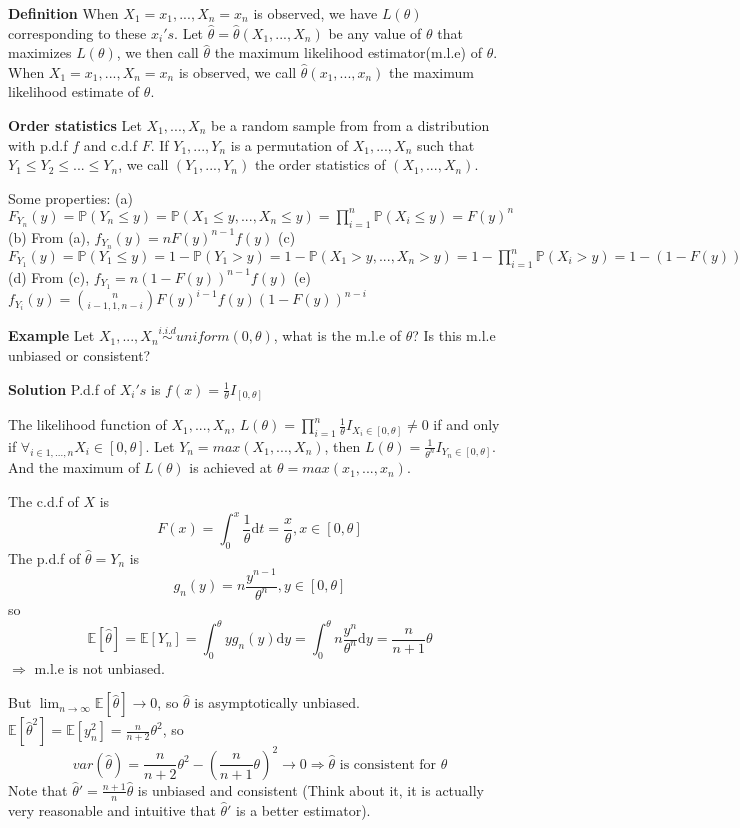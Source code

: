 \documentclass[a4paper,12pt]{article}
\begin{document}
\textbf{Definition} When $X_1 = x_1, ..., X_n = x_n$ is observed, we have $L(\theta)$ corresponding to these $x_i's$. Let $\hat{\theta} = \hat{\theta}(X_1, ..., X_n)$ be any value of $\theta$ that maximizes $L(\theta)$, we then call $\hat{\theta}$ the maximum likelihood estimator(m.l.e) of $\theta$. When $X_1 = x_1, ..., X_n = x_n$ is observed, we call $\hat{\theta}(x_1, ..., x_n)$ the maximum likelihood estimate of $\theta$.

\textbf{Order statistics}
Let $X_1, ..., X_n$ be a random sample from from a distribution with p.d.f $f$ and c.d.f $F$. If $Y_1, ..., Y_n$ is a permutation of $X_1, ..., X_n$ such that $Y_1 \leq Y_2 \leq ... \leq Y_n$, we call $(Y_1, ..., Y_n)$ the order statistics of $(X_1, ..., X_n)$. 

Some properties: 
(a) $F_{Y_n}(y) = \mathbb{P}( Y_n \leq y ) = \mathbb{P}(X_1 \leq y, ..., X_n \leq y) = \prod_{i=1}^n \mathbb{P}(X_i \leq y) = F(y)^n$ 
(b) From (a), $f_{Y_n} (y) = n F(y)^{n-1}f(y)$ 
(c) $F_{Y_1}(y) = \mathbb{P}( Y_1 \leq y ) = 1-\mathbb{P}( Y_1 > y ) = 1-\mathbb{P}(X_1 > y, ..., X_n > y) = 1-\prod_{i=1}^n \mathbb{P}(X_i > y) = 1-(1-F(y))^n$ 
(d) From (c), $f_{Y_1} = n(1-F(y))^{n-1}f(y)$ 
(e) $f_{Y_i}(y) = {n \choose i-1, 1, n-i} F(y)^{i-1}f(y)(1-F(y))^{n-i}$ 

\textbf{Example} Let $X_1, ..., X_n \overset{i.i.d}{\sim} uniform(0, \theta)$, what is the m.l.e of $\theta$? Is this m.l.e unbiased or consistent? 

\textbf{Solution} P.d.f of $X_i's$ is $f(x) = \frac{1}{\theta} I_{[0, \theta]}$

The likelihood function of $X_1, ..., X_n$, $L(\theta) = \prod_{i=1}^n \frac{1}{\theta} I_{X_i \in [0, \theta]} \neq 0$ if and only if $\forall_{i\in 1, ..., n} X_i \in [0, \theta]$. Let $Y_n = max(X_1, ..., X_n)$, then $L(\theta) = \frac{1}{\theta^n}I_{Y_n \in [0, \theta]}$. And the maximum of $L(\theta)$ is achieved at $\theta = max(x_1, ..., x_n)$.

The c.d.f of $X$ is
$$F(x) = \int_0^x \frac{1}{\theta}\mathrm{d}t = \frac{x}{\theta}, x\in [0, \theta]$$
The p.d.f of $\hat{\theta} = Y_n$ is
$$g_n(y) = n\frac{y^{n-1}}{\theta^n}, y \in [0, \theta]$$
so
$$\mathbb{E}[ \hat{\theta} ] = \mathbb{E}[Y_n] = \int_0^\theta y g_n(y) \mathrm{d}y = \int_0^\theta n\frac{y^n}{\theta^n} \mathrm{d}y = \frac{n}{n+1}\theta$$
$\Rightarrow$ m.l.e is not unbiased. 

But
$\lim_{n\to\infty} \mathbb{E}[\hat{\theta}] \to 0$, so $\hat{\theta}$ is asymptotically unbiased. $\mathbb{E}[\hat{\theta}^2] = \mathbb{E}[y_n^2] = \frac{n}{n+2}\theta^2$, so
$$var(\hat{\theta}) = \frac{n}{n+2}\theta^2 - (\frac{n}{n+1}\theta)^2  \to 0 \Rightarrow \hat{\theta}\text{ is consistent for } \theta$$
Note that $\hat{\theta}' = \frac{n+1}{n}\hat{\theta}$ is unbiased and consistent (Think about it, it is actually very reasonable and intuitive that $\hat{\theta}'$ is a better estimator). 
\end{document}
